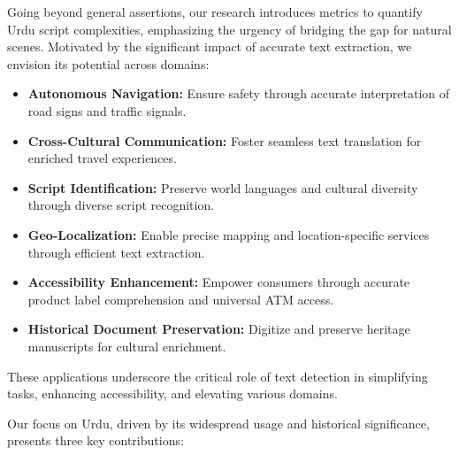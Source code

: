 \documentclass[default,iicol]{sn-jnl}%
\begin{document}
Going beyond general assertions, our research introduces metrics to quantify Urdu script complexities, emphasizing the urgency of bridging the gap for natural scenes. Motivated by the significant impact of accurate text extraction, we envision its potential across domains:

\begin{itemize}
	\item \textbf{Autonomous Navigation:} Ensure safety through accurate interpretation of road signs and traffic signals.
	\item \textbf{Cross-Cultural Communication:} Foster seamless text translation for enriched travel experiences.
	\item \textbf{Script Identification:} Preserve world languages and cultural diversity through diverse script recognition.
	\item \textbf{Geo-Localization:} Enable precise mapping and location-specific services through efficient text extraction.
	\item \textbf{Accessibility Enhancement:} Empower consumers through accurate product label comprehension and universal ATM access.
	\item \textbf{Historical Document Preservation:} Digitize and preserve heritage manuscripts for cultural enrichment.
\end{itemize}

These applications underscore the critical role of text detection in simplifying tasks, enhancing accessibility, and elevating various domains.

Our focus on Urdu, driven by its widespread usage and historical significance, presents three key contributions:
\end{document}
